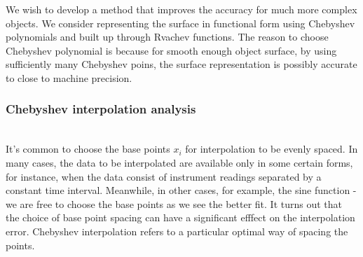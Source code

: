 \documentclass[11pt]{amsart}
\theoremstyle{definition}
\begin{document}
We wish to develop a method that improves the accuracy for much more complex objects. We consider representing the surface in functional form using Chebyshev polynomials and built up through Rvachev functions. The reason to choose Chebyshev polynomial is because for smooth enough object surface, by using sufficiently many Chebyshev poins, the surface representation is possibly accurate to close to machine precision.

\subsubsection{Chebyshev interpolation analysis}~\\
It's common to choose the base points $x_i$ for interpolation to be evenly spaced. In many cases, the data to be interpolated are available only in some certain forms, for instance, when the data consist of instrument readings separated by a constant time interval. Meanwhile, in other cases, for example, the sine function - we are free to choose the base points as we see the better fit. It turns out that the choice of base point spacing can have a significant efffect on the interpolation error. Chebyshev interpolation refers to a particular optimal way of spacing the points.
\end{document}
